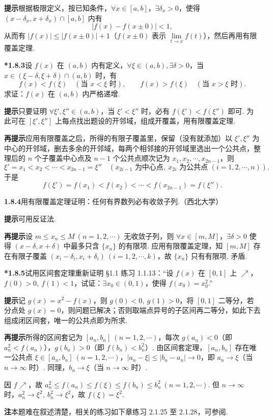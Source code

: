 \documentclass[UTF8,12pt,a4paper,fontset=fandol]{ctexart}
\begin{document}
\noindent\textbf{提示}\quad 根据极限定义，按已知条件，$\forall x\in[a,b]$，$\exists\delta_x>0$，使得 $(x-\delta_x,x+\delta_x)\cap[a,b]$ 内有
\[
  |f(x)-f(x\pm0)|<1,
\]
从而有 $|f(x)|\le |f(x\pm0)|+1$（$f(x\pm0)$ 表示 $\lim\limits_{t\to x}f(t)$），然后再用有限覆盖定理.

\noindent\textbf{*1.8.3}\quad 设 $f(x)$ 在 $(a,b)$ 内有定义，$\forall \xi\in(a,b),\exists\delta>0$，当 $x\in(\xi-\delta,\xi+\delta)\cap(a,b)$ 时，有
\[
  f(x)<f(\xi)\quad(\text{当 }x<\xi\text{ 时}),\qquad
  f(x)>f(\xi)\quad(\text{当 }x>\xi\text{ 时}).
\]
求证：$f(x)$ 在 $(a,b)$ 内严格递增.

\noindent\textbf{提示}\quad 只要证明 $\forall \xi',\xi''\in(a,b)$，当 $\xi'<\xi''$ 时，必有 $f(\xi')<f(\xi'')$ 即可. 为此可在 $[\xi',\xi'']$ 上每点找出题设的开邻域，组成开覆盖，用有限覆盖定理.

\noindent\textbf{再提示}\quad 应用有限覆盖之后，所得的有限子覆盖里，保留（没有就添加）以 $\xi',\xi''$ 为中心的开邻域，删去多余的开邻域，每两个相邻接的开邻域里选出一个公共点，整理后的 $n$ 个子覆盖中心点及 $n-1$ 个公共点顺次记为 $x_1,x_2,\cdots,x_{2n-1}$，则
\[
  \xi'=x_1<x_2<\cdots<x_{2n-1}=\xi''
  \quad(x_{2i-1}\text{ 为中心点},\ x_{2i}\text{ 为公共点 }(i=1,2,\cdots,n)).
\]
于是
\[
  f(\xi')=f(x_1)<f(x_2)<\cdots<f(x_{2n-1})=f(\xi'').
\]

\noindent\textbf{1.8.4}\quad 用有限覆盖定理证明：任何有界数列必有收敛子列.（西北大学）

\noindent\textbf{提示}\quad 可用反证法.

\noindent\textbf{再提示}\quad 设 $m\le x_n\le M\ (n=1,2,\cdots)$ 无收敛子列，则 $\forall x\in[m,M]$，$\exists\delta>0$ 使得 $(x-\delta,x+\delta)$ 中最多只含 $\{x_n\}$ 的有限项. 应用有限覆盖定理，知 $[m,M]$ 存在有限子覆盖 $(x_i-\delta_i,x_i+\delta_i)\ (i=1,2,\cdots,k)$，故 $\{x_n\}$ 只有有限项. 矛盾.

\noindent\textbf{*1.8.5}\quad 试用区间套定理重新证明 §1.1 练习 1.1.13：“设 $f(x)$ 在 $[0,1]$ 上 $\nearrow$，$f(0)>0,\ f(1)<1$，试证：$\exists x_0\in(0,1)$，使得 $f(x_0)=x_0^2$.”

\noindent\textbf{提示}\quad 记 $g(x)=x^2-f(x)$，则 $g(0)<0,\ g(1)>0$，将 $[0,1]$ 二等分，若分点处 $g(x)=0$，则问题已解决；否则取端点异号的子区间再二等分，如此下去组成闭区间套，唯一的公共点即为所求.

\noindent\textbf{再提示}\quad 所得的区间套记为 $[a_n,b_n]\ (n=1,2,\cdots)$，每次 $g(a_n)<0$（即 $a_n^2<f(a_n)$），$g(b_n)>0$（即 $f(b_n)<b_n^2$）. 由区间套定理，$[a_n,b_n]$ 存在唯一公共点 $\xi\in[a_n,b_n]\ (n=1,2,\cdots)$，$|a_n-\xi|\le |b_n-a_n|\to0$，即 $a_n\to\xi$（当 $n\to\infty$ 时）. 同理，$b_n\to\xi$（当 $n\to\infty$ 时）.

因 $f\nearrow$，故 $a_n^2\le f(a_n)\le f(\xi)\le f(b_n)\le b_n^2\ (n=1,2,\cdots)$. 但 $n\to\infty$ 时，$a_n^2\to\xi^2,\ b_n^2\to\xi^2$，故 $f(\xi)=\xi^2$.

\noindent\textbf{注}\quad 本题难在叙述清楚，相关的练习如下章练习 2.1.25 至 2.1.28，可参阅.
\end{document}
